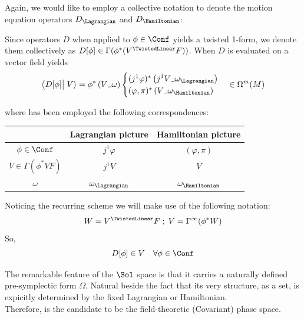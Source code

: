 \documentclass[a4paper,12pt]{scrartcl}  %
\begin{document}
Again, we would like to employ a collective notation to denote the motion equation operators $D_\Lagrangian$ and $D_\Hamiltonian$:
\begin{notation}
	
	Since operators $D$ when applied to $\phi \in \Conf$ yields a twisted 1-form, 
	we denote them collectively as $D[\phi] \in \Gamma(\phi^\ast(V^\TwistedLinear F))$.
	When $D$ is evaluated on a vector field yields
	\begin{displaymath}
		\left\langle D[\phi] \right\vert \left. V \right\rangle =
		\phi^\ast \left( V \lrcorner \omega \right) 
		\begin{cases}
			(j^1 \varphi)^\ast \left( j^1V \lrcorner \omega_\Lagrangian \right) \\
			(\varphi, \pi)^\ast \left( V \lrcorner \omega_\Hamiltonian \right)
		\end{cases}              
        \in \Omega^m(M)
	\end{displaymath}
	
	where has been employed the following correspondences:
	\begin{center}
		\begin{tabular}{|c|c|c|}
			\hline
			 & Lagrangian picture & Hamiltonian picture \\
			\hline
			$\phi \in \Conf$		&	$j^1 \varphi$		&	$(\varphi, \pi)$	\\
			$V \in \Gamma(\phi^\ast V F )$ & $j^1 V$ & $V$ \\
			$\omega$ & $\omega_\Lagrangian$ & $\omega_\Hamiltonian$ \\
			\hline
		\end{tabular}
	\end{center}	
	
	
	Noticing the recurring scheme we will make use of the following notation:
	\begin{displaymath}
		W = V^\TwistedLinear F \; ; \; V = \Gamma^\infty(\phi^\ast W)
	\end{displaymath}
	So,
	\begin{displaymath}
		D[\phi] \in V \quad \forall \phi \in \Conf
	\end{displaymath}
\end{notation}

The remarkable feature of the $\Sol$ space is that it carries a naturally defined pre-symplectic form $\Omega$. Natural beside the fact that its very structure, as a set, is expicitly determined by the fixed Lagrangian or Hamiltonian.\\
Therefore, is the candidate to  be the field-theoretic (Covariant) phase space.
\end{document}
